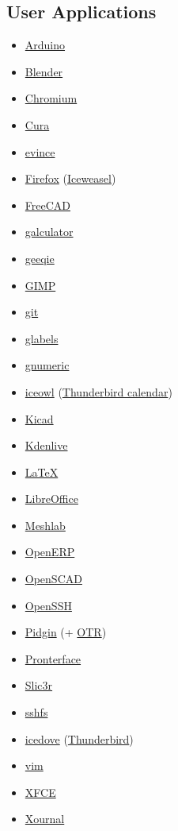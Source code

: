 \subsection{User Applications}
\begin{itemize}
\item \href{http://www.arduino.cc/}{Arduino}
\item \href{http://www.blender.org/}{Blender}
\item \href{http://www.chromium.org/}{Chromium}
\item \href{https://lulzbot.com/cura}{Cura}
\item \href{http://www.gnome.org/projects/evince/}{evince}
\item \href{http://www.mozilla.org/en-US/firefox/}{Firefox} (\href{https://wiki.debian.org/Iceweasel}{Iceweasel})
\item \href{http://www.freecadweb.org/}{FreeCAD}
\item \href{http://galculator.sourceforge.net/}{galculator}
\item \href{http://geeqie.sourceforge.net/}{geeqie}
\item \href{http://www.gimp.org/}{GIMP}
\item \href{http://git-scm.com/}{git}
\item \href{http://glabels.sourceforge.net/}{glabels}
\item \href{http://www.gnumeric.org/}{gnumeric}
\item \href{https://packages.debian.org/wheezy/iceowl-extension}{iceowl} (\href{http://www.mozilla.org/en-US/thunderbird/}{Thunderbird calendar})
\item \href{http://iut-tice.ujf-grenoble.fr/kicad/}{Kicad}
\item \href{http://www.kdenlive.org/}{Kdenlive}
\item \href{http://www.latex-project.org/}{LaTeX}
\item \href{https://www.libreoffice.org/}{LibreOffice}
\item \href{http://meshlab.sourceforge.net/}{Meshlab}
\item \href{http://www.openerp.com/}{OpenERP}
\item \href{http://www.openscad.org/}{OpenSCAD}
\item \href{http://www.openssh.com/}{OpenSSH}
\item \href{http://www.pidgin.im/}{Pidgin} (+ \href{https://otr.cypherpunks.ca/}{OTR})
\item \href{https://github.com/kliment/Printrun}{Pronterface}
\item \href{http://slic3r.org/}{Slic3r}
\item \href{http://fuse.sourceforge.net/sshfs.html}{sshfs}
\item \href{https://wiki.debian.org/Icedove}{icedove} (\href{http://www.mozilla.org/en-US/thunderbird/}{Thunderbird})
\item \href{http://www.vim.org/}{vim}
\item \href{http://www.xfce.org/}{XFCE}
\item \href{http://xournal.sourceforge.net/}{Xournal}
\end{itemize}

